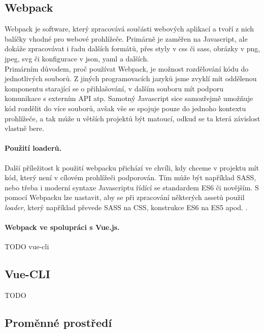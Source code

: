 \subsection{Webpack}

Webpack \cite{webpack} je software, který zpracovává součásti webových aplikací a tvoří z nich balíčky vhodné pro webové prohlížeče. Primárně je zaměřen na Javascript, ale dokáže zpracovávat i řadu dalších formátů, přes styly v css či sass, obrázky v png, jpeg, svg či konfigurace v json, yaml a dalších.\\
Primárním důvodem, proč používat Webpack, je možnost rozdělování kódu do jednotlivých souborů. Z jiných programovacích jazyků jsme zvyklí mít oddělenou komponentu starající se o přihlašování, v dalším souboru mít podporu komunikace s externím API atp. Samotný Javascript sice samozřejmě umožňuje kód rozdělit do více souborů, avšak vše se spojuje pouze do jednoho kontextu prohlížeče, a tak může u větších projektů být matoucí, odkud se ta která závislost vlastně bere.

\paragraph{Použití loaderů.} Další příležitost k použití webpacku přichází ve chvíli, kdy chceme v projektu mít kód, který není v cílovém prohlížeči podporován. Tím může být například SASS, nebo třeba i moderní syntaxe Javascriptu řídící se standardem ES6 či novějším. S pomocí Webpacku lze nastavit, aby se při zpracování některých assetů použil \emph{loader}, který například převede SASS na CSS, konstrukce ES6 na ES5 apod. \cite{webpack-ackee}.

\paragraph{Webpack ve spolupráci s Vue.js.} TODO vue-cli


\subsection{Vue-CLI}

TODO


\subsection{Proměnné prostředí}

